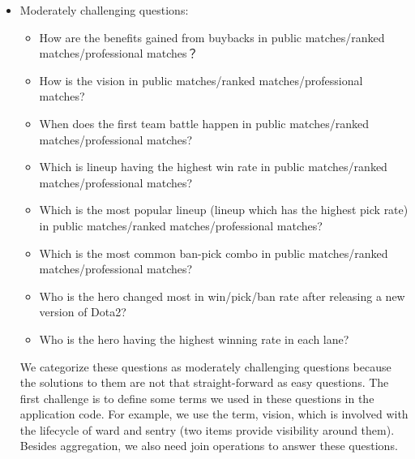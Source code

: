 \documentclass{article}
\begin{document}
\begin{itemize}
    \item Moderately challenging questions:
    \begin{itemize}
        \item How are the benefits gained from \gls{buyback}s in \gls{public matches}/\gls{ranked matches}/\gls{professional matches}？
        \item How is the vision in \gls{public matches}/\gls{ranked matches}/\gls{professional matches}?
        \item When does the first team battle happen in \gls{public matches}/\gls{ranked matches}/\gls{professional matches}?
        \item Which is lineup having the highest win rate in \gls{public matches}/\gls{ranked matches}/\gls{professional matches}?
        \item Which is the most popular lineup (lineup which has the highest pick rate) in \gls{public matches}/\gls{ranked matches}/\gls{professional matches}?
        \item Which is the most common ban-pick combo in \gls{public matches}/\gls{ranked matches}/\gls{professional matches}?
        \item Who is the hero changed most in win/\gls{pick}/\gls{ban} rate after releasing a new version of Dota2?
        \item Who is the hero having the highest winning rate in each \gls{lane}?
    \end{itemize}
    We categorize these questions as moderately challenging questions because the solutions to them are not that straight-forward as easy questions. The first challenge is to define some terms we used in these questions in the application code. For example, we use the term, vision, which is involved with the lifecycle of ward and sentry (two items provide visibility around them). Besides aggregation, we also need join operations to answer these questions.\\


\end{itemize}
\end{document}
